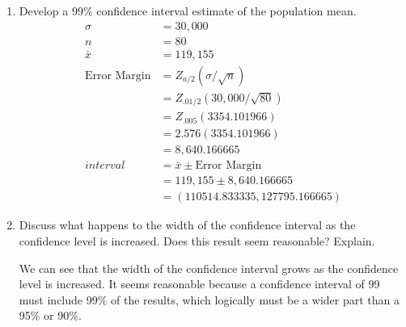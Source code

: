 \documentclass{article}
\begin{document}
\begin{enumerate}
  \item Develop a 99\% confidence interval estimate of the population mean.
  \begin{align*}
    \sigma &= 30,000\\
    n &= 80\\
    \bar{x} &= 119,155\\
    \text{Error Margin} &= Z_{a/2}(\sigma / \sqrt{n})\\
    &=Z_{.01/2}(30,000/ \sqrt{80})\\
    &=Z_{.005}(3354.101966)\\
    &=2.576(3354.101966)\\
    &=8,640.166665\\
    interval &= \bar{x} \pm \text{Error Margin}\\
    &= 119,155 \pm 8,640.166665\\
    &= (110514.833335, 127795.166665)
  \end{align*}
  \item Discuss what happens to the width of the confidence interval as the confidence level is increased. Does this result seem reasonable? Explain.

  We can see that the width of the confidence interval grows as the confidence level is increased. It seems reasonable because a confidence interval of 99 must include 99\% of the results, which logically must be a wider part than a 95\% or 90\%.
\end{enumerate}
\end{document}
